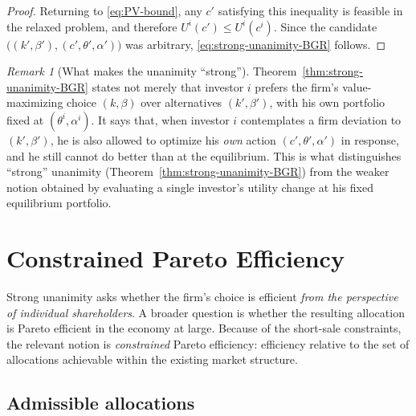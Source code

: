 \documentclass[11pt,a4paper,oneside]{book}
\def\leq{\leqslant}
\theoremstyle{plain}
\theoremstyle{definition}
\theoremstyle{remark}
\newtheorem{remark}[theorem]{Remark}
\numberwithin{equation}{chapter}
\begin{document}
\begin{proof}
Returning to \eqref{eq:PV-bound}, any $c'$ satisfying this inequality is feasible in the relaxed problem, and therefore $U^i(c') \leq U^i(c^i)$.
Since the candidate $\bigl( (k', \beta'), (c', \theta', \alpha') \bigr)$ was arbitrary, \eqref{eq:strong-unanimity-BGR} follows.
\end{proof}

\begin{remark}[What makes the unanimity ``strong'']\label{rem:why-strong}
Theorem~\ref{thm:strong-unanimity-BGR} states not merely that investor $i$ prefers the firm's value-maximizing choice $(k, \beta)$ over alternatives $(k', \beta')$, with his own portfolio fixed at $(\theta^i, \alpha^i)$.
It says that, when investor $i$ contemplates a firm deviation to $(k', \beta')$, he is also allowed to optimize his \emph{own} action $(c', \theta', \alpha')$ in response, and he still cannot do better than at the equilibrium.
This is what distinguishes ``strong'' unanimity (Theorem~\ref{thm:strong-unanimity-BGR}) from the weaker notion obtained by evaluating a single investor's utility change at his fixed equilibrium portfolio.
\end{remark}

\section{Constrained Pareto Efficiency}
\label{sec:constrained-efficiency}

Strong unanimity asks whether the firm's choice is efficient \emph{from the perspective of individual shareholders}.
A broader question is whether the resulting allocation is Pareto efficient in the economy at large.
Because of the short-sale constraints, the relevant notion is \emph{constrained} Pareto efficiency: efficiency relative to the set of allocations achievable within the existing market structure.

\subsection{Admissible allocations}
\end{document}
